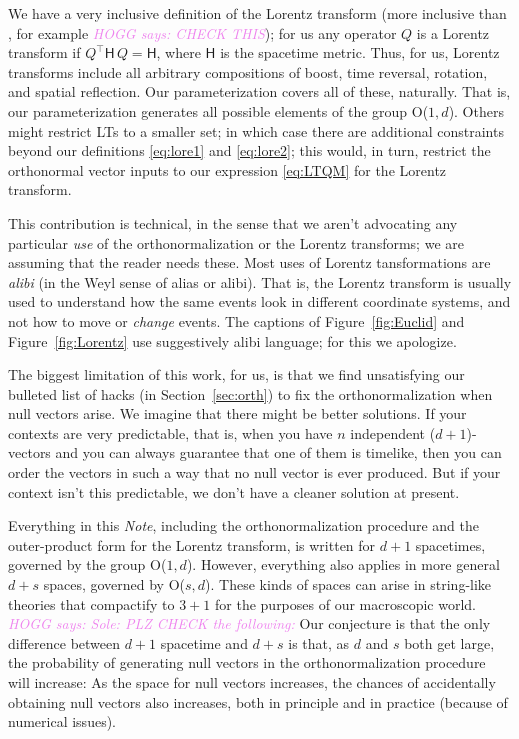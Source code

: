 \documentclass{article}
\newcommand{\metric}{\mathsf{H}}
\newcommand{\plus}{\!+\!} %
\newcommand{\documentname}{\textsl{Note}}
\newcommand{\secref}[1]{Section~\ref{#1}}
\newcommand{\figref}[1]{Figure~\ref{#1}}
\newcommand{\HOGG}[1]{\textcolor{violet}{\textsl{HOGG says: {#1}}}}
\begin{document}
We have a very inclusive definition of the Lorentz transform (more inclusive than \cite{haber}, for example \HOGG{CHECK THIS}); for us any operator $Q$ is a Lorentz transform if $Q^\top\metric\,Q=\metric$, where $\metric$ is the spacetime metric.
Thus, for us, Lorentz transforms include all arbitrary compositions of boost, time reversal, rotation, and spatial reflection.
Our parameterization covers all of these, naturally.
That is, our parameterization generates all possible elements of the group O($1,d$).
Others might restrict LTs to a smaller set; in which case there are additional constraints beyond our definitions \eqref{eq:lore1} and \eqref{eq:lore2}; this would, in turn, restrict the orthonormal vector inputs to our expression \eqref{eq:LTQM} for the Lorentz transform.

This contribution is technical, in the sense that we aren't advocating any particular \emph{use} of the orthonormalization or the Lorentz transforms; we are assuming that the reader needs these.
Most uses of Lorentz tansformations are \emph{alibi} (in the Weyl \cite{weyl} sense of alias or alibi).
That is, the Lorentz transform is usually used to understand how the same events look in different coordinate systems, and not how to move or \emph{change} events.
The captions of \figref{fig:Euclid} and \figref{fig:Lorentz} use suggestively alibi language; for this we apologize.

The biggest limitation of this work, for us, is that we find unsatisfying our bulleted list of hacks (in \secref{sec:orth}) to fix the orthonormalization when null vectors arise.
We imagine that there might be better solutions.
If your contexts are very predictable, that is, when you have $n$ independent ($d\plus1$)-vectors and you can always guarantee that one of them is timelike, then you can order the vectors in such a way that no null vector is ever produced.
But if your context isn't this predictable, we don't have a cleaner solution at present.

Everything in this \documentname{}, including the orthonormalization procedure and the outer-product form for the Lorentz transform, is written for $d\plus1$ spacetimes, governed by the group O($1,d$).
However, everything also applies in more general $d\plus s$ spaces, governed by O($s,d$).
These kinds of spaces can arise in string-like theories that compactify to $3\plus 1$ for the purposes of our macroscopic world.
\HOGG{Sole: PLZ CHECK the following:}
Our conjecture is that the only difference between $d\plus1$ spacetime and $d\plus s$ is that, as $d$ and $s$ both get large, the probability of generating null vectors in the orthonormalization procedure will increase:
As the space for null vectors increases, the chances of accidentally obtaining null vectors also increases, both in principle and in practice (because of numerical issues).
\end{document}
